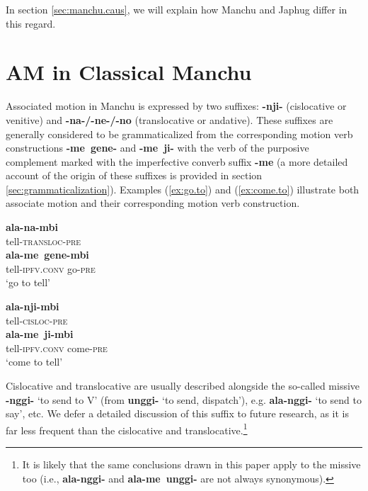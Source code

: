 \documentclass{article}
\newcommand{\ipa}[1]{\textbf{{\phon\mbox{#1}}}} %
\begin{document}
  In section \ref{sec:manchu.caus}, we will explain how Manchu and Japhug differ in this regard.
  
\section{AM in Classical Manchu} \label{sec:manchu}

Associated motion in Manchu is expressed by two suffixes: \ipa{-nji-} (cislocative or venitive) and \ipa{-na-/-ne-/-no} (translocative or andative). These suffixes are generally considered to be grammaticalized from the corresponding motion verb constructions \ipa{-me gene-} and \ipa{-me ji-} with the verb of the purposive complement marked with the imperfective converb suffix \ipa{-me} (a more detailed account of the origin of these suffixes is provided in section \ref{sec:grammaticalization}). Examples (\ref{ex:go.to}) and (\ref{ex:come.to}) illustrate both associate motion and their corresponding motion verb construction.

\begin{exe}
\ex \label{ex:go.to}
\begin{xlist}
 \label{ex:alanambi}
\gll \ipa{ala-na-mbi} \\
tell-\textsc{transloc-pre} \\
 \label{ex:alame.genembi}
\gll \ipa{ala-me gene-mbi} \\
tell-\textsc{ipfv.conv} go-\textsc{pre} \\
\glt `go to tell'
\end{xlist}
\ex \label{ex:come.to}
\begin{xlist}
 \label{ex:alanjimbi}
\gll \ipa{ala-nji-mbi} \\
tell-\textsc{cisloc-pre} \\
  \label{ex:alame.jimbi}
\gll \ipa{ala-me ji-mbi} \\
tell-\textsc{ipfv.conv} come-\textsc{pre} \\
\glt `come to tell'
\end{xlist}
\end{exe}


Cislocative and translocative are usually described alongside the so-called missive \ipa{-nggi-} ‘to send to V’ (from \ipa{unggi-} ‘to send, dispatch’), e.g. \ipa{ala-nggi-} ‘to send to say’, etc. We defer a detailed discussion of this suffix to future research, as it is far less frequent than the cislocative and translocative.\footnote{It is likely that the same conclusions drawn in this paper apply to the missive too (i.e., \ipa{ala-nggi-} and \ipa{ala-me unggi-} are not always synonymous).}
\end{document}
